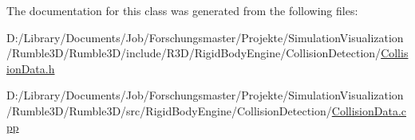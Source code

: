 The documentation for this class was generated from the following files\+:\begin{DoxyCompactItemize}
\item 
D\+:/\+Library/\+Documents/\+Job/\+Forschungsmaster/\+Projekte/\+Simulation\+Visualization/\+Rumble3\+D/\+Rumble3\+D/include/\+R3\+D/\+Rigid\+Body\+Engine/\+Collision\+Detection/\mbox{\hyperlink{_collision_data_8h}{Collision\+Data.\+h}}\item 
D\+:/\+Library/\+Documents/\+Job/\+Forschungsmaster/\+Projekte/\+Simulation\+Visualization/\+Rumble3\+D/\+Rumble3\+D/src/\+Rigid\+Body\+Engine/\+Collision\+Detection/\mbox{\hyperlink{_collision_data_8cpp}{Collision\+Data.\+cpp}}\end{DoxyCompactItemize}
